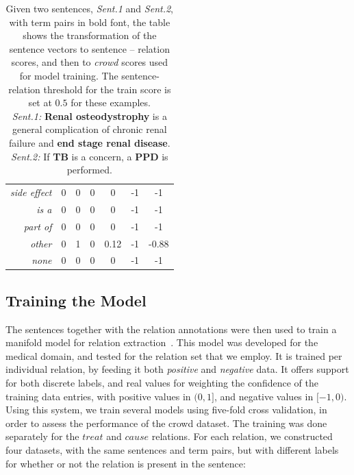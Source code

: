 \begin{table}[htb!]
{\begin{tabular}{rcccccc}
\cellcolor{aliceblue}\textit{side effect}     & \cellcolor{aliceblue}0  & \cellcolor{aliceblue}0 & \cellcolor{aliceblue}0    & \cellcolor{aliceblue}0    & \cellcolor{aliceblue}-1    & \cellcolor{aliceblue}-1 \\
\textit{is a}            & 0  & 0 & 0    & 0    & -1    & -1 \\
\cellcolor{aliceblue}\textit{part of}         & \cellcolor{aliceblue}0  & \cellcolor{aliceblue}0 & \cellcolor{aliceblue}0    & \cellcolor{aliceblue}0    & \cellcolor{aliceblue}-1    & \cellcolor{aliceblue}-1 \\
\textit{other}           & 0  & 1 & 0    & 0.12 & -1    & -0.88 \\
\cellcolor{aliceblue}\textit{none}            & \cellcolor{aliceblue}0  & \cellcolor{aliceblue}0 & \cellcolor{aliceblue}0    & \cellcolor{aliceblue}0    & \cellcolor{aliceblue}-1    & \cellcolor{aliceblue}-1 \\
\bottomrule
\end{tabular}
}

\caption[CrowdTruth metrics examples]{Given two sentences, \textit{Sent.1} and \textit{Sent.2}, with term pairs in bold font, the table shows the transformation of the sentence vectors to sentence -- relation scores, and then to \textit{crowd} scores used for model training. The sentence-relation threshold for the train score is set at $0.5$ for these examples. \\

\textit{Sent.1:} \textbf{Renal osteodystrophy} is a general complication of chronic renal failure and \textbf{end stage renal disease}.\\
\textit{Sent.2:} If \textbf{TB} is a concern, a \textbf{PPD} is performed.
}

\label{tab:scores}
\end{table}


\subsection{Training the Model}

The sentences together with the relation annotations were then used to train a manifold model for relation extraction~\cite{P14-1078}.  This model was developed for the medical domain, and tested for the relation set that we employ.  It is trained per individual relation, by feeding it both \textit{positive} and \textit{negative} data.  It offers support for both discrete labels, and real values for weighting the confidence of the training data entries, with positive values in $(0, 1]$, and negative values in $[-1, 0)$. Using this system, we train several models using five-fold cross validation, in order to assess the performance of the crowd dataset. The training was done separately for the $treat$ and $cause$ relations. For each relation, we constructed four datasets, with the same sentences and term pairs, but with different labels for whether or not the relation is present in the sentence:

